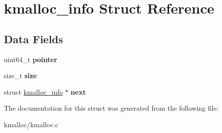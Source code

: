 \hypertarget{structkmalloc__info}{}\section{kmalloc\+\_\+info Struct Reference}
\label{structkmalloc__info}
\subsection*{Data Fields}
\begin{DoxyCompactItemize}
\item 
uint64\+\_\+t {\bfseries pointer}\hypertarget{structkmalloc__info_a755eb2ec7d2bd3643a38aa0f7c7a7c7b}{}\label{structkmalloc__info_a755eb2ec7d2bd3643a38aa0f7c7a7c7b}

\item 
size\+\_\+t {\bfseries size}\hypertarget{structkmalloc__info_a2382e9a86bb8b6140c58f61a9ccbddde}{}\label{structkmalloc__info_a2382e9a86bb8b6140c58f61a9ccbddde}

\item 
struct \hyperlink{structkmalloc__info}{kmalloc\+\_\+info} $\ast$ {\bfseries next}\hypertarget{structkmalloc__info_af9c032649e97ea4d38b960eaf47d0170}{}\label{structkmalloc__info_af9c032649e97ea4d38b960eaf47d0170}

\end{DoxyCompactItemize}


The documentation for this struct was generated from the following file\+:\begin{DoxyCompactItemize}
\item 
kmalloc/kmalloc.\+c\end{DoxyCompactItemize}
